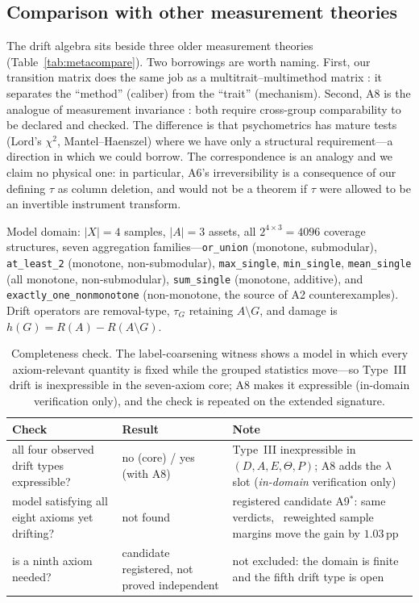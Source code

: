 \documentclass{article}
\newcommand{\pp}{\,\mathrm{pp}}
\begin{document}
\subsection{Comparison with other measurement theories}
\label{sec:metacompare}

The drift algebra sits beside three older measurement theories
(Table~\ref{tab:metacompare}). Two borrowings are worth naming. First, our transition matrix does the same
job as a multitrait--multimethod matrix \citep{campbell1959convergent}: it separates the ``method''
(caliber) from the ``trait'' (mechanism). Second, A8 is the analogue of measurement invariance
\citep{meredith1993measurement}: both require cross-group comparability to be declared and checked. The
difference is that psychometrics has mature tests (Lord's $\chi^{2}$, Mantel--Haenszel) where we have only a
structural requirement---a direction in which we could borrow. The correspondence is an analogy and we
claim no physical one: in particular, A6's irreversibility is a consequence of our defining $\tau$ as column
deletion, and would not be a theorem if $\tau$ were allowed to be an invertible instrument transform.


Model domain: $|X|=4$ samples, $|A|=3$ assets, all $2^{4\times3}=4096$ coverage structures, seven
aggregation families---\texttt{or\_union} (monotone, submodular), \texttt{at\_least\_2} (monotone,
non-submodular), \texttt{max\_single}, \texttt{min\_single}, \texttt{mean\_single} (all monotone,
non-submodular), \texttt{sum\_single} (monotone, additive), and
\texttt{exactly\_one\_nonmonotone} (non-monotone, the source of A2 counterexamples). Drift operators are
removal-type, $\tau_G$ retaining $A\setminus G$, and damage is $h(G)=R(A)-R(A\setminus G)$.

\begin{table}[h]
\centering
\small
\caption{Completeness check. The label-coarsening witness shows a model in which every axiom-relevant
quantity is fixed while the grouped statistics move---so Type~III drift is inexpressible in the seven-axiom
core; A8 makes it expressible (in-domain verification only), and the check is repeated on the extended
signature.}
\label{tab:completeness}
\begin{tabular}{@{}p{5.4cm} p{1.9cm} p{4.4cm}@{}}
\toprule
Check & Result & Note \\
\midrule
all four observed drift types expressible? & no (core) / yes (with A8) & Type~III inexpressible in $(D,A,E,\Theta,P)$; A8 adds the $\lambda$ slot (\emph{in-domain} verification only) \\
model satisfying all eight axioms yet drifting? & not found & registered candidate A9$^{*}$: same verdicts, ~reweighted sample margins move the gain by $1.03\pp$ \\
is a ninth axiom needed? & candidate registered, not proved independent & not excluded: the domain is finite and the fifth drift type is open \\
\bottomrule
\end{tabular}
\end{table}
\end{document}
